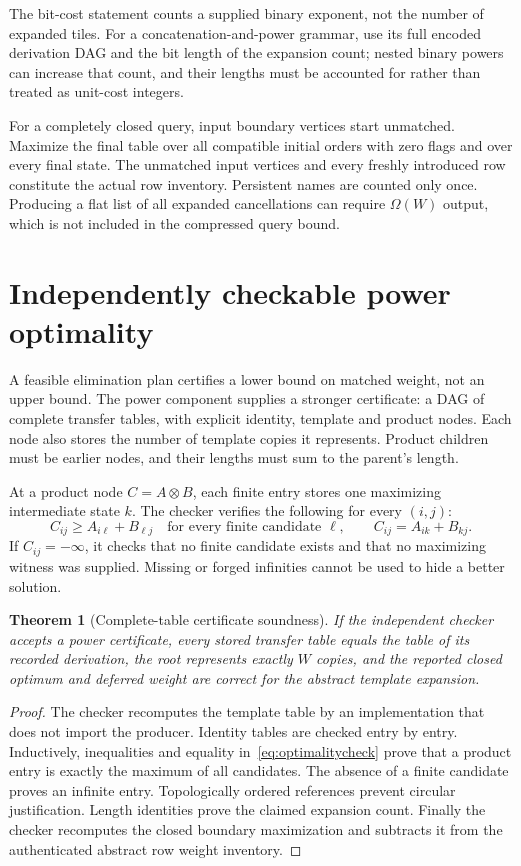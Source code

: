 \documentclass[11pt,a4paper]{article}
\newtheorem{theorem}{Theorem}[section]
\theoremstyle{definition}
\theoremstyle{remark}
\newcommand{\mi}{-\infty}
\begin{document}
The bit-cost statement counts a supplied binary exponent, not the number
of expanded tiles. For a concatenation-and-power grammar, use its full
encoded derivation DAG and the bit length of the expansion count; nested
binary powers can increase that count, and their lengths must be accounted
for rather than treated as unit-cost integers.

For a completely closed query, input boundary vertices start unmatched.
Maximize the final table over all compatible initial orders with zero
flags and over every final state. The unmatched input vertices and every
freshly introduced row constitute the actual row inventory. Persistent
names are counted only once. Producing a flat list of all expanded
cancellations can require $\Omega(W)$ output, which is not included in the
compressed query bound.

\section{Independently checkable power optimality}
\label{sec:proofdag}

A feasible elimination plan certifies a lower bound on matched weight,
not an upper bound. The power component supplies a stronger certificate:
a DAG of complete transfer tables, with explicit identity, template and
product nodes. Each node also stores the number of template copies it
represents. Product children must be earlier nodes, and their lengths must
sum to the parent's length.

At a product node $C=A\otimes B$, each finite entry stores one maximizing
intermediate state $k$. The checker verifies the following for every
$(i,j)$:
\begin{equation}
 C_{ij}\geq A_{i\ell}+B_{\ell j}
 \quad\text{for every finite candidate }\ell,
 \qquad
 C_{ij}=A_{ik}+B_{kj}.
 \label{eq:optimalitycheck}
\end{equation}
If $C_{ij}=\mi$, it checks that no finite candidate exists and that no
maximizing witness was supplied. Missing or forged infinities cannot be
used to hide a better solution.

\begin{theorem}[Complete-table certificate soundness]
\label{thm:checker}
If the independent checker accepts a power certificate, every stored
transfer table equals the table of its recorded derivation, the root
represents exactly $W$ copies, and the reported closed optimum and deferred
weight are correct for the abstract template expansion.
\end{theorem}
\begin{proof}
The checker recomputes the template table by an implementation that does
not import the producer. Identity tables are checked entry by entry.
Inductively, inequalities and equality in~\eqref{eq:optimalitycheck} prove
that a product entry is exactly the maximum of all candidates. The absence
of a finite candidate proves an infinite entry. Topologically ordered
references prevent circular justification. Length identities prove the
claimed expansion count. Finally the checker recomputes the closed
boundary maximization and subtracts it from the authenticated abstract row
weight inventory.
\end{proof}
\end{document}
